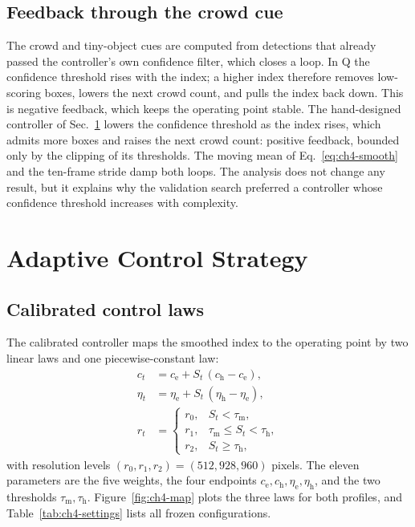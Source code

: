 \subsection{Feedback through the crowd cue}
The crowd and tiny-object cues are computed from detections that already passed the controller's own confidence filter, which closes a loop. In Q the confidence threshold rises with the index; a higher index therefore removes low-scoring boxes, lowers the next crowd count, and pulls the index back down. This is negative feedback, which keeps the operating point stable. The hand-designed controller of Sec.~\ref{sec:ch4-control} lowers the confidence threshold as the index rises, which admits more boxes and raises the next crowd count: positive feedback, bounded only by the clipping of its thresholds. The moving mean of Eq.~\eqref{eq:ch4-smooth} and the ten-frame stride damp both loops. The analysis does not change any result, but it explains why the validation search preferred a controller whose confidence threshold increases with complexity.

\section{Adaptive Control Strategy}\label{sec:ch4-control}

\subsection{Calibrated control laws}
The calibrated controller maps the smoothed index to the operating point by two linear laws and one piecewise-constant law:
\begin{align}
c_t &= c_{\mathrm{e}} + S_t\,(c_{\mathrm{h}} - c_{\mathrm{e}}), \label{eq:ch4-conf}\\
\eta_t &= \eta_{\mathrm{e}} + S_t\,(\eta_{\mathrm{h}} - \eta_{\mathrm{e}}), \label{eq:ch4-nms}\\
r_t &= \begin{cases} r_0, & S_t < \tau_{\mathrm{m}},\\ r_1, & \tau_{\mathrm{m}} \le S_t < \tau_{\mathrm{h}},\\ r_2, & S_t \ge \tau_{\mathrm{h}}, \end{cases} \label{eq:ch4-res}
\end{align}
with resolution levels $(r_0, r_1, r_2) = (512, 928, 960)$ pixels. The eleven parameters are the five weights, the four endpoints $c_{\mathrm{e}}, c_{\mathrm{h}}, \eta_{\mathrm{e}}, \eta_{\mathrm{h}}$, and the two thresholds $\tau_{\mathrm{m}}, \tau_{\mathrm{h}}$. Figure~\ref{fig:ch4-map} plots the three laws for both profiles, and Table~\ref{tab:ch4-settings} lists all frozen configurations.

